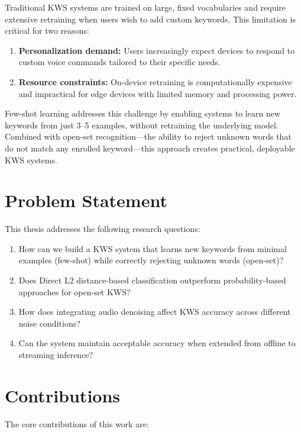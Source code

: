 \documentclass[12pt,a4paper]{report}
\begin{document}
Traditional KWS systems are trained on large, fixed vocabularies and require
extensive retraining when users wish to add custom keywords. This limitation
is critical for two reasons:

\begin{enumerate}
    \item \textbf{Personalization demand:} Users increasingly expect devices
          to respond to custom voice commands tailored to their specific needs.
    \item \textbf{Resource constraints:} On-device retraining is
          computationally expensive and impractical for edge devices with
          limited memory and processing power.
\end{enumerate}

Few-shot learning addresses this challenge by enabling systems to learn new
keywords from just 3--5 examples, without retraining the underlying model.
Combined with open-set recognition---the ability to reject unknown words that
do not match any enrolled keyword---this approach creates practical,
deployable KWS systems.

\section{Problem Statement}

This thesis addresses the following research questions:

\begin{enumerate}
    \item How can we build a KWS system that learns new keywords from minimal
          examples (few-shot) while correctly rejecting unknown words (open-set)?
    \item Does Direct L2 distance-based classification outperform
          probability-based approaches for open-set KWS?
    \item How does integrating audio denoising affect KWS accuracy across
          different noise conditions?
    \item Can the system maintain acceptable accuracy when extended from
          offline to streaming inference?
\end{enumerate}

\section{Contributions}

The core contributions of this work are:
\end{document}
